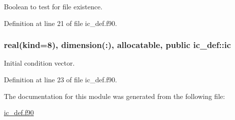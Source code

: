 Boolean to test for file existence. 



Definition at line 21 of file ic\-\_\-def.\-f90.

\hypertarget{classic__def_abef3b68b2ee81311ed2c796cba3a382f}{
\subsubsection[{ic}]{\setlength{\rightskip}{0pt plus 5cm}real(kind=8), dimension(\-:), allocatable, public ic\-\_\-def\-::ic}}\label{classic__def_abef3b68b2ee81311ed2c796cba3a382f}


Initial condition vector. 



Definition at line 23 of file ic\-\_\-def.\-f90.



The documentation for this module was generated from the following file\-:\begin{DoxyCompactItemize}
\item 
\hyperlink{ic__def_8f90}{ic\-\_\-def.\-f90}\end{DoxyCompactItemize}

